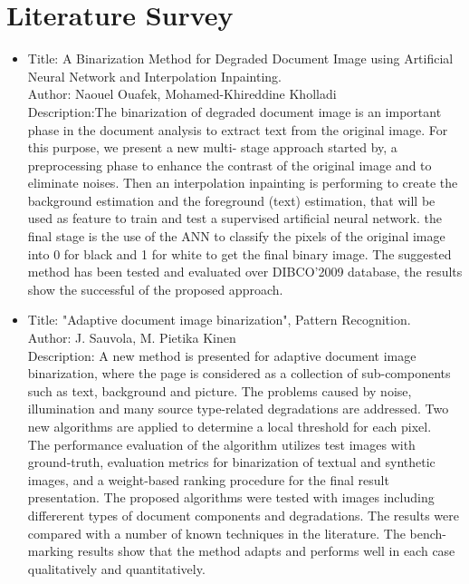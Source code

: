 \documentclass[oneside,a4paper,12pt]{report}
\begin{document}
\chapter{Literature Survey}
\begin{itemize}
\item Title: A Binarization Method for Degraded Document
Image using Artificial Neural Network and Interpolation Inpainting.\\
Author: Naouel Ouafek, Mohamed-Khireddine Kholladi\\
Description:The binarization of degraded document image is an
important phase in the document analysis to extract text from
the original image. For this purpose, we present a new multi-
stage approach started by, a preprocessing phase to enhance the contrast of the original image and to eliminate noises. Then an interpolation inpainting is performing to create the background estimation and the foreground (text) estimation, that will be used as feature to train and test a supervised artificial neural network. the final stage is the use of the ANN to classify the pixels of the original image into 0 for black and 1 for white to get the final binary image. The suggested method has been tested and evaluated over DIBCO’2009 database, the results show the successful of the proposed approach.\\

\item Title: "Adaptive document image binarization",
Pattern Recognition.\\
Author: J. Sauvola, M. Pietika Kinen\\
Description: A new method is presented for adaptive document image binarization, where the page is considered as a collection of sub-components such as text, background and picture. The problems caused by noise, illumination and many source type-related degradations are addressed. Two new algorithms are applied to determine a local threshold for each pixel.\\
The performance evaluation of the algorithm utilizes test images with ground-truth, evaluation metrics for binarization
of textual and synthetic images, and a weight-based ranking procedure for the final result presentation. The proposed
algorithms were tested with images including differerent types of document components and degradations. The results were
compared with a number of known techniques in the literature. The bench-marking results show that the method adapts
and performs well in each case qualitatively and quantitatively.\\


\end{itemize}
\end{document}
